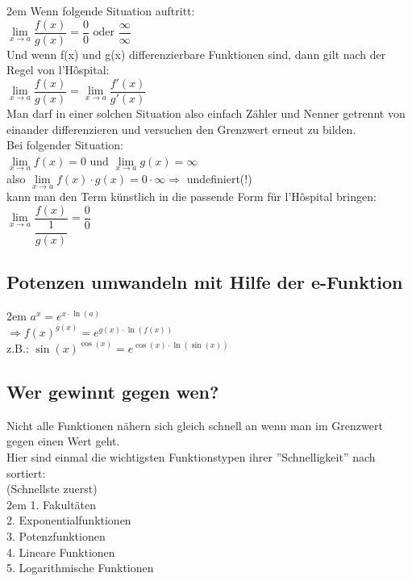 \documentclass[11pt,final]{scrreprt}
\newcommand{\br} {\medskip\\}
\begin{document}
\begingroup
\leftskip2em 
Wenn folgende Situation auftritt:\br
$ \lim\limits_{x\to a} \dfrac{f(x)}{g(x)} = \dfrac{0}{0} \text{ oder } \dfrac{\infty}{\infty} $\br
Und wenn f(x) und g(x) differenzierbare Funktionen sind, dann gilt nach der Regel von l'Hôspital:\br
$ \lim\limits_{x\to a} \dfrac{f(x)}{g(x)} = \lim\limits_{x\to a} \dfrac{f'(x)}{g'(x)} $\br
Man darf in einer solchen Situation also einfach Zähler und Nenner getrennt von einander differenzieren und versuchen den Grenzwert erneut zu bilden.\bigskip\medskip\\
Bei folgender Situation:\\
$ \lim\limits_{x\to a} f(x) = 0 $ und $ \lim\limits_{x\to a} g(x) = \infty $\\
also $ \lim\limits_{x\to a} f(x)\cdot g(x) = {0}\cdot{\infty} \Rightarrow $ undefiniert(!)\\
kann man den Term künstlich in die passende Form für l'Hôspital bringen:\\
$ \lim\limits_{x\to a} \dfrac{f(x)}{\dfrac{1}{g(x)}} = \dfrac{0}{0}$\\
\par	
\endgroup 

\subsection*{Potenzen umwandeln mit Hilfe der e-Funktion}

\begingroup
\leftskip2em 
$ a^x = e^{x \cdot \ln(a)} $\\
$ \Rightarrow f(x)^{g(x)} = e^{g(x) \cdot \ln(f(x))} $\br
$ \text{z.B.: } \sin(x)^{\cos(x)} = e^{\cos(x) \cdot \ln(\sin(x))}$\\
\par	
\endgroup 

\subsection*{Wer gewinnt gegen wen?}

Nicht alle Funktionen nähern sich gleich schnell an wenn man im Grenzwert gegen einen Wert geht.\\
Hier sind einmal die wichtigsten Funktionstypen ihrer ''Schnelligkeit'' nach sortiert:\\
(Schnellste zuerst)\\

\begingroup
\leftskip2em 
1. Fakultäten\\
2. Exponentialfunktionen\\
3. Potenzfunktionen\\
4. Lineare Funktionen\\
5. Logarithmische Funktionen\\\
\end{document}
